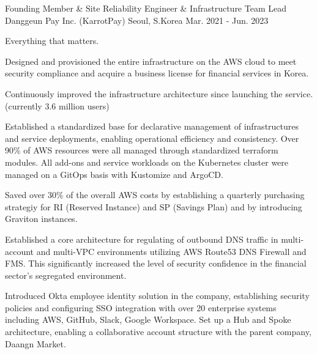 \begin{cventries}
  \cventry
  {Founding Member \& Site Reliability Engineer \& Infrastructure Team Lead} %
  {Danggeun Pay Inc. (KarrotPay)} %
  {Seoul, S.Korea} %
  {Mar. 2021 - Jun. 2023} %
  {
    \begin{cvitems} %
      \item {Everything that matters.}
      \item {Designed and provisioned the entire infrastructure on the AWS cloud to meet security compliance and acquire a business license for financial services in Korea.}
      \item {Continuously improved the infrastructure architecture since launching the service. (currently 3.6 million users)}
      \item {Established a standardized base for declarative management of infrastructures and service deployments, enabling operational efficiency and consistency. Over 90\% of AWS resources were all managed through standardized terraform modules. All add-ons and service workloads on the Kubernetes cluster were managed on a GitOps basis with Kustomize and ArgoCD.}
      \item {Saved over 30\% of the overall AWS costs by establishing a quarterly purchasing strategiy for RI (Reserved Instance) and SP (Savings Plan) and by introducing Graviton instances.}
      \item {Established a core architecture for regulating of outbound DNS traffic in multi-account and multi-VPC environments utilizing AWS Route53 DNS Firewall and FMS. This significantly increased the level of security confidence in the financial sector's segregated environment.}
      \item {Introduced Okta employee identity solution in the company, establishing security policies and configuring SSO integration with over 20 enterprise systems including AWS, GitHub, Slack, Google Workspace. Set up a Hub and Spoke architecture, enabling a collaborative account structure with the parent company, Daangn Market.}
    \end{cvitems}
  }


\end{cventries}
